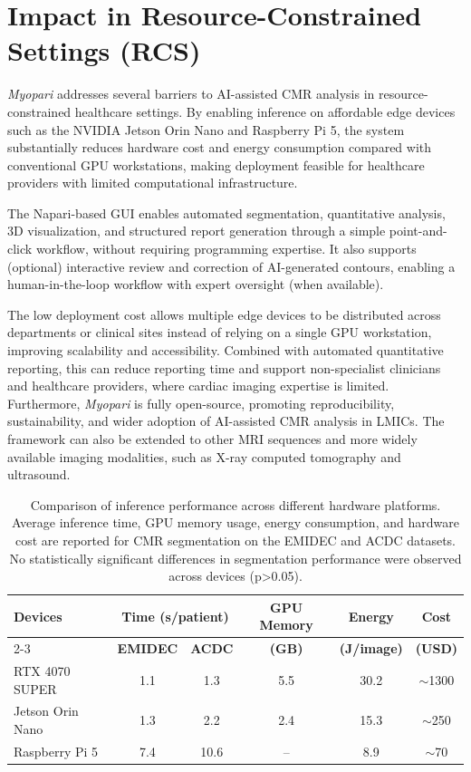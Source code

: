 \documentclass[runningheads]{llncs}
\begin{document}
\section{Impact in Resource-Constrained Settings (RCS)}
\textit{Myopari} addresses several barriers to AI-assisted CMR analysis in resource-constrained healthcare settings. By enabling inference on affordable edge devices such as the NVIDIA Jetson Orin Nano and Raspberry Pi 5, the system substantially reduces hardware cost and energy consumption compared with conventional GPU workstations, making deployment feasible for healthcare providers with limited computational infrastructure.

The Napari-based GUI enables automated segmentation, quantitative analysis, 3D visualization, and structured report generation through a simple point-and-click workflow, without requiring programming expertise. It also supports (optional) interactive review and correction of AI-generated contours, enabling a human-in-the-loop workflow with expert oversight (when available).

The low deployment cost allows multiple edge devices to be distributed across departments or clinical sites instead of relying on a single GPU workstation, improving scalability and accessibility. Combined with automated quantitative reporting, this can reduce reporting time and support non-specialist clinicians and healthcare providers, where cardiac imaging expertise is limited. Furthermore, \textit{Myopari} is fully open-source, promoting reproducibility, sustainability, and wider adoption of AI-assisted CMR analysis in LMICs. The framework can also be extended to other MRI sequences and more widely available imaging modalities, such as X-ray computed tomography and ultrasound. 
\begin{table}[!ht]
\centering
\caption{Comparison of inference performance across different hardware platforms. Average inference time, GPU memory usage, energy consumption, and hardware cost are reported for CMR segmentation on the EMIDEC and ACDC datasets. No statistically significant differences in segmentation performance were observed across devices (p>0.05).}
\label{tab:hardware}
\begin{tabular}{lccccc}
\toprule
\multirow{2}{*}{\textbf{Devices}} &
\multicolumn{2}{c}{\textbf{Time (s/patient)}} &
\textbf{GPU Memory} &
\textbf{Energy} &
\textbf{Cost} \\
\cmidrule(lr){2-3}
& \textbf{EMIDEC} & \textbf{ACDC} & \textbf{(GB)} & \textbf{(J/image)} & \textbf{(USD)} \\
\midrule
RTX 4070 SUPER & 1.1 & 1.3 & 5.5 & 30.2 & $\sim$1300 \\
Jetson Orin Nano              & 1.3 & 2.2 & 2.4 & 15.3 & $\sim$250 \\
Raspberry Pi 5                & 7.4 & 10.6 & --  & 8.9  & $\sim$70 \\
\bottomrule
\end{tabular}
\end{table}
\end{document}
